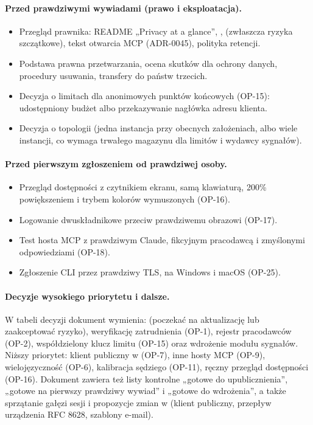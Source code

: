 \paragraph{Przed prawdziwymi wywiadami (prawo i eksploatacja).}
\begin{itemize}[leftmargin=*,itemsep=2pt]
  \item Przegląd prawnika: README „Privacy at a glance”, ,  (zwłaszcza ryzyka szczątkowe), tekst otwarcia MCP (ADR-0045), polityka retencji.
  \item Podstawa prawna przetwarzania, ocena skutków dla ochrony danych, procedury usuwania, transfery do państw trzecich.
  \item Decyzja o limitach dla anonimowych punktów końcowych (OP-15): udostępniony budżet albo przekazywanie nagłówka adresu klienta.
  \item Decyzja o topologii (jedna instancja przy obecnych założeniach, albo wiele instancji, co wymaga trwałego magazynu dla limitów i wydawcy sygnałów).
\end{itemize}

\paragraph{Przed pierwszym zgłoszeniem od prawdziwej osoby.}
\begin{itemize}[leftmargin=*,itemsep=2pt]
  \item Przegląd dostępności z czytnikiem ekranu, samą klawiaturą, 200\% powiększeniem i trybem kolorów wymuszonych (OP-16).
  \item Logowanie dwuskładnikowe przeciw prawdziwemu obrazowi  (OP-17).
  \item Test hosta MCP z prawdziwym Claude, fikcyjnym pracodawcą i zmyślonymi odpowiedziami (OP-18).
  \item Zgłoszenie CLI przez prawdziwy TLS, na Windows i macOS (OP-25).
\end{itemize}

\paragraph{Decyzje wysokiego priorytetu i dalsze.} W tabeli decyzji dokument wymienia:  (poczekać na aktualizację lub zaakceptować ryzyko), weryfikację zatrudnienia (OP-1), rejestr pracodawców (OP-2), współdzielony klucz limitu (OP-15) oraz wdrożenie modułu sygnałów. Niższy priorytet: klient publiczny w  (OP-7), inne hosty MCP (OP-9), wielojęzyczność (OP-6), kalibracja sędziego (OP-11), ręczny przegląd dostępności (OP-16). Dokument zawiera też listy kontrolne „gotowe do upublicznienia”, „gotowe na pierwszy prawdziwy wywiad” i „gotowe do wdrożenia”, a także sprzątanie gałęzi sesji i propozycje zmian w  (klient publiczny, przepływ urządzenia RFC 8628, szablony e-mail).

